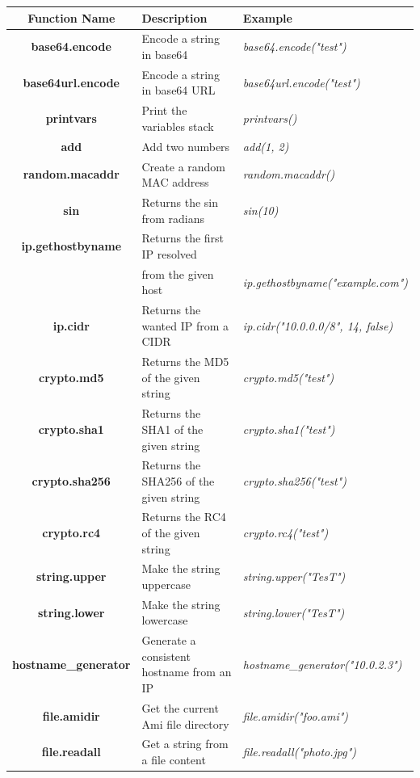 \documentclass[10pt]{article}
\begin{document}
\hspace*{-3cm}\begin{tabular}{|c|l|l|}
  \hline
  \textbf{Function Name} & \textbf{Description} & \textbf{Example} \\
  \hline
  \hline
  \textbf{base64.encode} & Encode a string in base64 & \textit{base64.encode("test")}\\
  \hline
  \textbf{base64url.encode} & Encode a string in base64 URL & \textit{base64url.encode("test")}\\
  \hline
  \textbf{printvars} & Print the variables stack & \textit{printvars()}\\
  \hline
  \textbf{add} & Add two numbers & \textit{add(1, 2)}\\
  \hline
  \textbf{random.macaddr} & Create a random MAC address & \textit{random.macaddr()}\\
  \hline
  \textbf{sin} & Returns the sin from radians & \textit{sin(10)}\\
  \hline
  \textbf{ip.gethostbyname} & Returns the first IP resolved & \\
  & from the given host & \textit{ip.gethostbyname("example.com")}\\
  \hline
  \textbf{ip.cidr} & Returns the wanted IP from a CIDR & \textit{ip.cidr("10.0.0.0/8", 14, false)}\\
  \hline
  \textbf{crypto.md5} & Returns the MD5 of the given string & \textit{crypto.md5("test")}\\
  \hline
  \textbf{crypto.sha1} & Returns the SHA1 of the given string & \textit{crypto.sha1("test")}\\
  \hline
  \textbf{crypto.sha256} & Returns the SHA256 of the given string & \textit{crypto.sha256("test")}\\
  \hline
  \textbf{crypto.rc4} & Returns the RC4 of the given string & \textit{crypto.rc4("test")}\\
  \hline
  \textbf{string.upper} & Make the string uppercase & \textit{string.upper("TesT")}\\
  \hline
  \textbf{string.lower} & Make the string lowercase & \textit{string.lower("TesT")}\\
  \hline
  \textbf{hostname\_generator} & Generate a consistent hostname from an IP & \textit{hostname\_generator("10.0.2.3")}\\
  \hline
  \textbf{file.amidir} & Get the current Ami file directory & \textit{file.amidir("foo.ami")}\\
  \hline
  \textbf{file.readall} & Get a string from a file content & \textit{file.readall("photo.jpg")}\\

\end{tabular}
\end{document}
